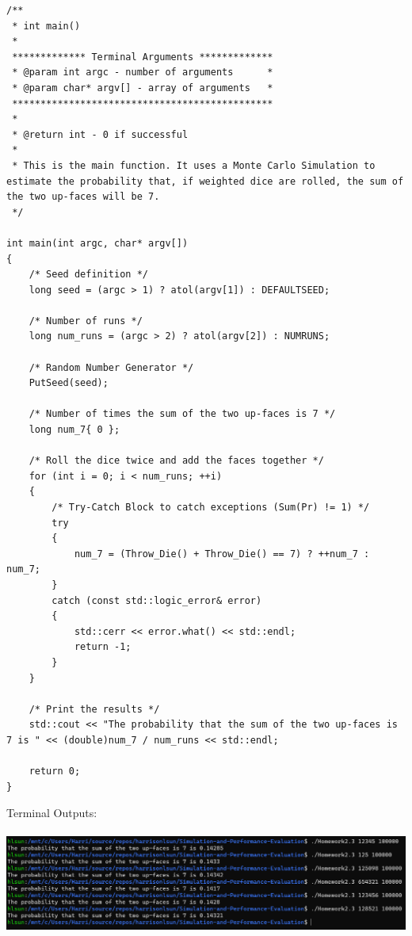\begin{lstlisting}[style=CStyle]
/**
 * int main()
 * 
 ************* Terminal Arguments *************
 * @param int argc - number of arguments      *
 * @param char* argv[] - array of arguments   *
 **********************************************
 * 
 * @return int - 0 if successful
 * 
 * This is the main function. It uses a Monte Carlo Simulation to estimate the probability that, if weighted dice are rolled, the sum of the two up-faces will be 7.
 */

int main(int argc, char* argv[])
{
	/* Seed definition */
	long seed = (argc > 1) ? atol(argv[1]) : DEFAULTSEED;

	/* Number of runs */
	long num_runs = (argc > 2) ? atol(argv[2]) : NUMRUNS;
	
	/* Random Number Generator */
	PutSeed(seed);
	
	/* Number of times the sum of the two up-faces is 7 */
	long num_7{ 0 };

	/* Roll the dice twice and add the faces together */
	for (int i = 0; i < num_runs; ++i)
	{
		/* Try-Catch Block to catch exceptions (Sum(Pr) != 1) */
		try 
		{
			num_7 = (Throw_Die() + Throw_Die() == 7) ? ++num_7 : num_7;
		}
		catch (const std::logic_error& error)
		{
			std::cerr << error.what() << std::endl;
			return -1;
		}
	}

	/* Print the results */
	std::cout << "The probability that the sum of the two up-faces is 7 is " << (double)num_7 / num_runs << std::endl;

	return 0;
}
\end{lstlisting}
\vspace{50pt}
Terminal Outputs:\\\\
\includegraphics[scale=0.55]{Sections/H2_3.png}\\\\
